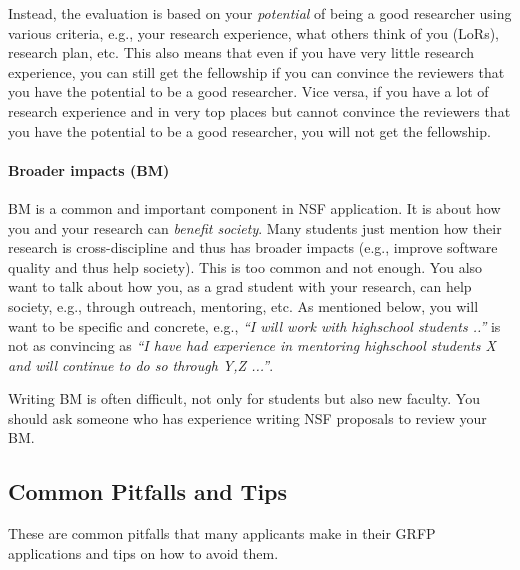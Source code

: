 \documentclass[oneside,11pt,dvipsnames]{book}
\begin{document}
Instead, the evaluation is based on your \emph{potential} of being a good researcher using various criteria, e.g., your research experience, what others think of you (LoRs), research plan, etc. This also means that even if you have very little research experience, you can still get the fellowship if you can convince the reviewers that you have the potential to be a good researcher.  Vice versa, if you have a lot of research experience and in very top places but cannot convince the reviewers that you have the potential to be a good researcher, you will not get the fellowship.

\paragraph{Broader impacts (BM)} BM is a common and important component in NSF application. It is about how you and your research can \emph{benefit society}.  Many students just mention how their research is cross-discipline and thus has broader impacts (e.g., improve software quality and thus help society).  This is too common and not enough.  You also want to talk about how you, as a grad student with your research, can help society, e.g., through outreach, mentoring, etc. As mentioned below, you will want to be specific and concrete, e.g., \emph{``I will work with highschool students ..''} is not as convincing as \emph{``I have had experience in mentoring highschool students X and will continue to do so through Y,Z ...''}.  

Writing BM is often difficult, not only for students but also new faculty.  You should ask someone who has experience writing NSF proposals to review your BM.

\subsection{Common Pitfalls and Tips}\label{sec:grfp-pitfalls}

These are common pitfalls that many applicants make in their GRFP applications and tips on how to avoid them.
\end{document}
